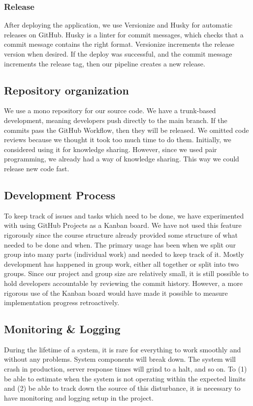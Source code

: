 \subsubsection{Release}
After deploying the application, we use Versionize and Husky for automatic releases on GitHub. Husky is a linter for commit messages, which checks that a commit message contains the right format. Versionize increments the release version when desired. If the deploy was successful, and the commit message increments the release tag, then our pipeline creates a new release.

\subsection{Repository organization}
We use a mono repository for our source code. We have a trunk-based development, meaning developers push directly to the main branch. If the commits pass the GitHub Workflow, then they will be released. We omitted code reviews because we thought it took too much time to do them. Initially, we considered using it for knowledge sharing. However, since we used pair programming, we already had a way of knowledge sharing. This way we could release new code fast.

\subsection{Development Process}
To keep track of issues and tasks which need to be done, we have experimented with using GitHub Projects as a Kanban board. We have not used this feature rigorously since the course structure already provided some structure of what needed to be done and when. The primary usage has been when we split our group into many parts (individual work) and needed to keep track of it. Mostly development has happened in group work, either all together or split into two groups. Since our project and group size are relatively small, it is still possible to hold developers accountable by reviewing the commit history. However, a more rigorous use of the Kanban board would have made it possible to measure implementation progress retroactively. 

\subsection{Monitoring \& Logging}
During the lifetime of a system, it is rare for everything to work smoothly and without any problems. System components will break down. The system will crash in production, server response times will grind to a halt, and so on. To (1) be able to estimate when the system is not operating within the expected limits and (2) be able to track down the source of this disturbance, it is necessary to have monitoring and logging setup in the project.

